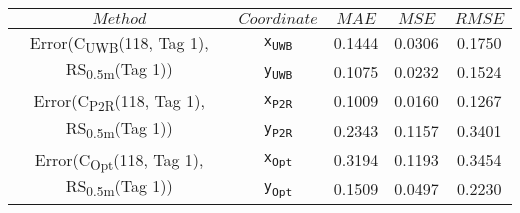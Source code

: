 \begin{table}[h]
\centering
\begin{tabular}{|c|c|c|c|c|}
\hline
$Method$ & $Coordinate$ & $MAE$ & $MSE$ & $RMSE$ \\
\hline
\multirow{2}{*}{{\footnotesize Error(C\textsubscript{UWB}(118, Tag 1), RS\textsubscript{0.5m}(Tag 1))}} & \texttt{x\textsubscript{UWB}} & 0.1444 & 0.0306 & 0.1750 \\
& \texttt{y\textsubscript{UWB}} & 0.1075 & 0.0232 & 0.1524 \\
\hline
\multirow{2}{*}{{\footnotesize Error(C\textsubscript{P2R}(118, Tag 1), RS\textsubscript{0.5m}(Tag 1))}} & \texttt{x\textsubscript{P2R}} & 0.1009 & 0.0160 & 0.1267 \\
& \texttt{y\textsubscript{P2R}} & 0.2343 & 0.1157 & 0.3401 \\
\hline
\multirow{2}{*}{{\footnotesize Error(C\textsubscript{Opt}(118, Tag 1), RS\textsubscript{0.5m}(Tag 1))}} & \texttt{x\textsubscript{Opt}} & 0.3194 & 0.1193 & 0.3454 \\
& \texttt{y\textsubscript{Opt}} & 0.1509 & 0.0497 & 0.2230 \\
\hline
\end{tabular}
\end{table}
